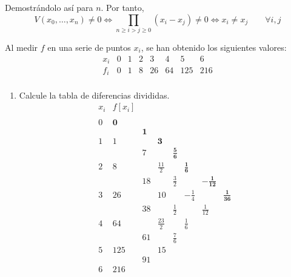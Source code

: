 \begin{ejercicio}
\begin{itemize}
        Demostrándolo así para $n$. Por tanto,
        $$V(x_0, \dots, x_n) \neq 0 \Longleftrightarrow \prod_{n\geq i>j\geq 0}(x_i-x_j) \neq 0 \Longleftrightarrow x_i\neq x_j \qquad \forall i,j$$
    \end{itemize}
\end{ejercicio}

\begin{ejercicio}
    Al medir $f$ en una serie de puntos $x_i$, se han obtenido los siguientes valores:
    \begin{equation*}
        \begin{array}{c|cccccccc}
            x_i & 0 & 1 & 2 & 3 & 4 & 5 & 6 \\ \hline
            f_i & 0 & 1 & 8 & 26 & 64 & 125 & 216 \\
        \end{array}
    \end{equation*}

    \begin{enumerate}
        \item Calcule la tabla de diferencias divididas.
        \begin{equation*}
            \begin{array}{c|ccccccc}
                x_i & f[x_i] \\
                \\
                0 & \textbf{0} \\
                && \textbf{1}\\
                1 & 1 && \textbf{3}\\
                && 7&&\mathbf{\frac{5}{6}}\\
                2 & 8 && \frac{11}{2} && \mathbf{\frac{1}{6}}\\
                && 18 && \frac{3}{2} && \mathbf{-\frac{1}{12}}\\
                3 & 26 && 10 && -\frac{1}{4} && \mathbf{\frac{1}{36}}\\
                && 38 && \frac{1}{2} && \frac{1}{12}\\
                4 & 64 && \frac{23}{2} && \frac{1}{6}\\
                && 61  && \frac{7}{6}\\
                5 & 125 && 15\\
                && 91\\
                6 & 216
            \end{array}
        \end{equation*}
        

\end{enumerate}
\end{ejercicio}

